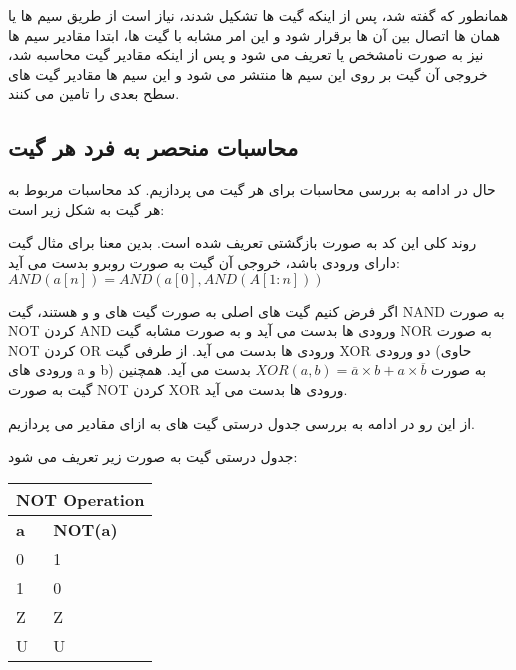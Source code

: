 همانطور که گفته شد، پس از اینکه گیت ها تشکیل شدند، نیاز است از طریق سیم ها یا همان
ها اتصال بین آن ها برقرار شود و این امر مشابه با گیت ها، ابتدا مقادیر سیم ها نیز به صورت نامشخص یا 
تعریف می شود و پس از اینکه مقادیر گیت محاسبه شد، خروجی آن گیت بر روی این سیم ها منتشر می شود و این سیم ها مقادیر گیت های سطح بعدی را تامین می کنند.

\subsection{محاسبات منحصر به فرد هر گیت}
حال در ادامه به بررسی محاسبات برای هر گیت می پردازیم. کد محاسبات مربوط به هر گیت به شکل زیر است: 

\small {\lr{}}

روند کلی این کد به صورت بازگشتی تعریف شده است. بدین معنا برای مثال گیت 
دارای 
ورودی باشد، خروجی آن گیت به صورت روبرو بدست می آید:
$AND(a[n]) = AND(a[0], AND(A[1:n]))$


 اگر فرض کنیم گیت های اصلی به صورت گیت های 
و 
و
هستند، گیت NAND به صورت NOT کردن AND ورودی ها بدست می آید و به صورت مشابه گیت 
NOR
به صورت NOT کردن OR ورودی ها بدست می آید. از طرفی گیت XOR دو ورودی (حاوی ورودی های a و b) به صورت 
$XOR(a,b) = \overline{a} \times b + a \times \overline{b}$
بدست می آید. همچنین گیت 
به صورت NOT کردن XOR ورودی ها بدست می آید.

از این رو در ادامه به بررسی جدول درستی گیت های 
به ازای مقادیر 
می پردازیم. 

جدول درستی گیت
به صورت زیر تعریف می شود:

\begin{latin}
\begin{center}
	\begin{tabular}{ |p{3cm}|p{3cm}| }
		\hline
		\multicolumn{2}{|c|}{NOT Operation} \\
		\hline
		\textbf{a} & \textbf{NOT(a)} \\
		\hline
		0 & 1 \\
		1 & 0 \\
		Z & Z \\
		U & U \\
		\hline
	\end{tabular}
\end{center}
\end{latin}

